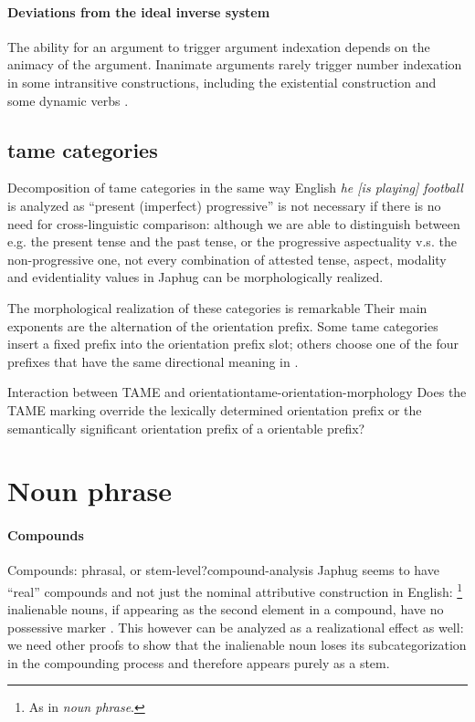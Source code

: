 \documentclass[a4paper, oneside, 12pt]{report}
\newcommand*{\citesec}[1]{\S~{#1}}
\newcommand*{\citetable}[1]{Table~{#1}}
\newcommand*{\citepage}[1]{p.~{#1}}
\newcommand{\form}[1]{\emph{#1}}
\begin{document}
\paragraph*{Deviations from the ideal inverse system}
The ability for an argument to trigger argument indexation
depends on the animacy of the argument.
Inanimate arguments rarely trigger number indexation in some intransitive constructions,
including the existential construction and some dynamic verbs
\citep[\citesec{14.6.1.1}]{jacques2021grammar}.


\subsection{\ac{tame} categories}


Decomposition of \acs{tame} categories 
in the same way English \form{he [is playing] football} 
is analyzed as ``present (imperfect) progressive'' is not necessary
if there is no need for cross-linguistic comparison:
although we are able to distinguish between e.g. the present tense and the past tense,
or the progressive aspectuality v.s. the non-progressive one,
not every combination of attested tense, aspect, modality and evidentiality values in Japhug 
can be morphologically realized.

The morphological realization of these categories is remarkable
Their main exponents are the alternation of the orientation prefix.
Some \acs{tame} categories insert a fixed prefix 
into the orientation prefix slot;
others choose one of the four prefixes that have the same directional meaning 
in \citet[\citetable{15.1}]{jacques2021grammar}. 

\begin{todobox}{Interaction between TAME and orientation}{tame-orientation-morphology}
    Does the TAME marking override the lexically determined orientation prefix 
    or the semantically significant orientation prefix of a orientable prefix?
\end{todobox}

\section{Noun phrase}

\paragraph*{Compounds} 

\begin{todobox}{Compounds: phrasal, or stem-level?}{compound-analysis}
    Japhug seems to have ``real'' compounds and not just
    the nominal attributive construction in English:%
    \footnote{
        As in \form{noun phrase}.
    }
    inalienable nouns, if appearing as the second element in a compound,
    have no possessive marker \citep[\citepage{15}]{jacques2021grammar}. 
    This however can be analyzed as a realizational effect as well:
    we need other proofs to show that the inalienable noun 
    loses its subcategorization in the compounding process
    and therefore appears purely as a stem.
\end{todobox}
\end{document}
